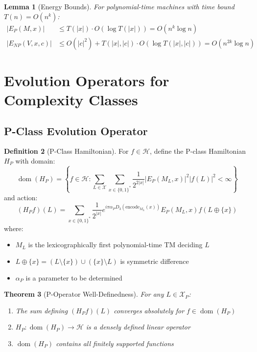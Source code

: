 \documentclass[12pt]{article}
\theoremstyle{plain}
\newtheorem{theorem}{Theorem}[section]
\newtheorem{lemma}[theorem]{Lemma}
\theoremstyle{definition}
\newtheorem{definition}[theorem]{Definition}
\DeclareMathOperator{\dom}{dom}
\newcommand{\digitalsum}{D}
\newcommand{\encode}{\text{encode}}
\begin{document}
\begin{lemma}[Energy Bounds]
\label{lem:energy_bounds}
For polynomial-time machines with time bound $T(n) = O(n^k)$:
\begin{align}
|E_P(M, x)| &\leq T(|x|) \cdot O(\log T(|x|)) = O(n^k \log n)\\
|E_{NP}(V, x, c)| &\leq O(|c|^2) + T(|x|, |c|) \cdot O(\log T(|x|, |c|)) = O(n^{2k} \log n)
\end{align}
\end{lemma}

\section{Evolution Operators for Complexity Classes}

\subsection{P-Class Evolution Operator}

\begin{definition}[P-Class Hamiltonian]
\label{def:h_p}
For $f \in \mathcal{H}$, define the P-class Hamiltonian $H_P$ with domain:
\begin{equation}
\dom(H_P) = \left\{f \in \mathcal{H} : \sum_{L \in \mathcal{X}} \sum_{x \in \{0,1\}^*} \frac{1}{2^{2|x|}} |E_P(M_L, x)|^2 |f(L)|^2 < \infty\right\}
\end{equation}
and action:
\begin{equation}
(H_P f)(L) = \sum_{x \in \{0,1\}^*} \frac{1}{2^{|x|}} e^{i\pi\alpha_P \digitalsum_3(\encode_{M_L}(x))} E_P(M_L, x) f(L \oplus \{x\})
\end{equation}
where:
\begin{itemize}
\item $M_L$ is the lexicographically first polynomial-time TM deciding $L$
\item $L \oplus \{x\} = (L \setminus \{x\}) \cup (\{x\} \setminus L)$ is symmetric difference
\item $\alpha_P$ is a parameter to be determined
\end{itemize}
\end{definition}

\begin{theorem}[P-Operator Well-Definedness]
\label{thm:p_welldefined}
For any $L \in \mathcal{X}_P$:
\begin{enumerate}
\item The sum defining $(H_P f)(L)$ converges absolutely for $f \in \dom(H_P)$
\item $H_P: \dom(H_P) \to \mathcal{H}$ is a densely defined linear operator
\item $\dom(H_P)$ contains all finitely supported functions
\end{enumerate}
\end{theorem}
\end{document}
